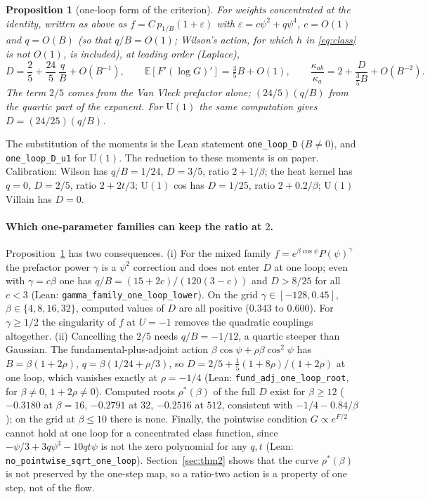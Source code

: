 \documentclass[11pt,a4paper]{article}
\newtheorem{proposition}[lemma]{Proposition}
\theoremstyle{definition}
\theoremstyle{remark}
\newcommand{\E}{\mathbb{E}}
\newcommand{\code}[1]{\texttt{#1}}
\begin{document}
\begin{proposition}[one-loop form of the criterion]\label{prop:D}
For weights concentrated at the identity, written as above as $f=C\,p_{1/B}(1+\varepsilon)$ with $\varepsilon=c\psi^2+q\psi^4$, $c=O(1)$ and $q=O(B)$ \textup{(}so that $q/B=O(1)$; Wilson's action, for which $h$ in \eqref{eq:class} is not $O(1)$, is included\textup{)}, at leading order (Laplace),
\[
D=\frac25+\frac{24}{5}\,\frac{q}{B}+O(B^{-1}),\qquad \E[F'(\log G)']=\tfrac35B+O(1),\qquad \frac{\kappa_{ab}}{\kappa_a}=2+\frac{D}{\frac35B}+O(B^{-2}).
\]
The term $2/5$ comes from the Van Vleck prefactor alone; $(24/5)(q/B)$ from the quartic part of the exponent.
For $\mathrm{U}(1)$ the same computation gives $D=(24/25)(q/B)$.
\end{proposition}

The substitution of the moments is the Lean statement \code{one\_loop\_D} ($B\ne0$), and \code{one\_loop\_D\_u1} for $\mathrm{U}(1)$.
The reduction to these moments is on paper.
Calibration: Wilson has $q/B=1/24$, $D=3/5$, ratio $2+1/\beta$; the heat kernel has $q=0$, $D=2/5$, ratio $2+2t/3$; $\mathrm{U}(1)$ cos has $D=1/25$, ratio $2+0.2/\beta$; $\mathrm{U}(1)$ Villain has $D=0$.

\paragraph{Which one-parameter families can keep the ratio at $2$.}
Proposition~\ref{prop:D} has two consequences.
(i) For the mixed family $f=e^{\beta\cos\psi}P(\psi)^\gamma$ the prefactor power $\gamma$ is a $\psi^2$ correction and does not enter $D$ at one loop; even with $\gamma=c\beta$ one has $q/B=(15+2c)/(120(3-c))$ and $D>8/25$ for all $c<3$ (Lean: \code{gamma\_family\_one\_loop\_lower}).
On the grid $\gamma\in[-128,0.45]$, $\beta\in\{4,8,16,32\}$, computed values of $D$ are all positive ($0.343$ to $0.600$).
For $\gamma\ge1/2$ the singularity of $f$ at $U=-1$ removes the quadratic couplings altogether.
(ii) Cancelling the $2/5$ needs $q/B=-1/12$, a quartic steeper than Gaussian.
The fundamental-plus-adjoint action $\beta\cos\psi+\rho\beta\cos^2\psi$ has $B=\beta(1+2\rho)$, $q=\beta(1/24+\rho/3)$, so $D=2/5+\tfrac15(1+8\rho)/(1+2\rho)$ at one loop, which vanishes exactly at $\rho=-1/4$ (Lean: \code{fund\_adj\_one\_loop\_root}, for $\beta\ne0$, $1+2\rho\ne0$).
Computed roots $\rho^*(\beta)$ of the full $D$ exist for $\beta\ge12$ ($-0.3180$ at $\beta=16$, $-0.2791$ at $32$, $-0.2516$ at $512$, consistent with $-1/4-0.84/\beta$); on the grid at $\beta\le10$ there is none.
Finally, the pointwise condition $G\propto e^{F/2}$ cannot hold at one loop for a concentrated class function, since $-\psi/3+3q\psi^3-10qt\psi$ is not the zero polynomial for any $q,t$ (Lean: \code{no\_pointwise\_sqrt\_one\_loop}).
Section~\ref{sec:thm2} shows that the curve $\rho^*(\beta)$ is not preserved by the one-step map, so a ratio-two action is a property of one step, not of the flow.
\end{document}
